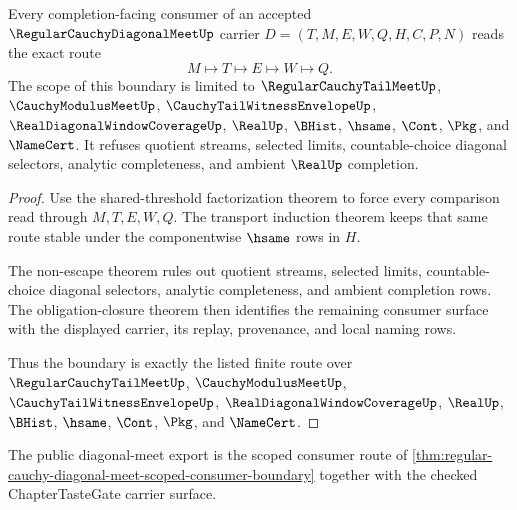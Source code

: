 \begin{theorem}
\label{thm:regular-cauchy-diagonal-meet-scoped-consumer-boundary}
Every completion-facing consumer of an accepted $\RegularCauchyDiagonalMeetUp$ carrier $D=(T,M,E,W,Q,H,C,P,N)$ reads the exact route
$$
M \longmapsto T \longmapsto E \longmapsto W \longmapsto Q.
$$
The scope of this boundary is limited to $\RegularCauchyTailMeetUp$, $\CauchyModulusMeetUp$, $\CauchyTailWitnessEnvelopeUp$, $\RealDiagonalWindowCoverageUp$, $\RealUp$, $\BHist$, $\hsame$, $\Cont$, $\Pkg$, and $\NameCert$. It refuses quotient streams, selected limits, countable-choice diagonal selectors, analytic completeness, and ambient $\RealUp$ completion.
\end{theorem}
\begin{proof}
Use the shared-threshold factorization theorem to force every comparison read through $M,T,E,W,Q$. The transport induction theorem keeps that same route stable under the componentwise $\hsame$ rows in $H$.

The non-escape theorem rules out quotient streams, selected limits, countable-choice diagonal selectors, analytic completeness, and ambient completion rows. The obligation-closure theorem then identifies the remaining consumer surface with the displayed carrier, its replay, provenance, and local naming rows.

Thus the boundary is exactly the listed finite route over $\RegularCauchyTailMeetUp$, $\CauchyModulusMeetUp$, $\CauchyTailWitnessEnvelopeUp$, $\RealDiagonalWindowCoverageUp$, $\RealUp$, $\BHist$, $\hsame$, $\Cont$, $\Pkg$, and $\NameCert$.
\end{proof}

The public diagonal-meet export is the scoped consumer route of \autoref{thm:regular-cauchy-diagonal-meet-scoped-consumer-boundary} together with the checked ChapterTasteGate carrier surface.

